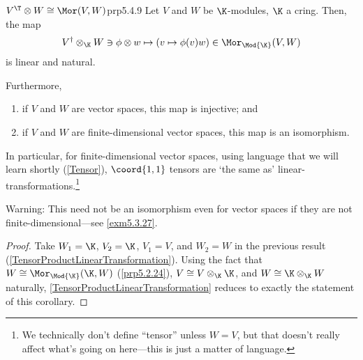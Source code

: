 \begin{crl}{$V^{\T}\otimes W\cong \Mor (V,W)$}{prp5.4.9}
	Let $V$ and $W$ be $\K$-modules, $\K$ a cring.  Then, the map
	\begin{equation}
		V^{\dagger}\otimes _{\K}W\ni \phi \otimes w\mapsto (v\mapsto \phi (v)w)\in \Mor _{\Mod{\K}}(V,W)
	\end{equation}
	is linear and natural.
	
	Furthermore,
	\begin{enumerate}
		\item if $V$ and $W$ are vector spaces, this map is injective; and
		\item if $V$ and $W$ are finite-dimensional vector spaces, this map is an isomorphism.
	\end{enumerate}
	\begin{rmk}
		In particular, for finite-dimensional vector spaces, using language that we will learn shortly (\cref{Tensor}), $\coord{1,1}$ tensors are `the same as' linear-transformations.\footnote{We technically don't define ``tensor'' unless $W=V$, but that doesn't really affect what's going on here---this is just a matter of language.}
	\end{rmk}
	\begin{rmk}
		Warning:  This need not be an isomorphism even for vector spaces if they are not finite-dimensional---see \cref{exm5.3.27}.
	\end{rmk}
	\begin{proof}
		Take $W_1=\K$, $V_2=\K$, $V_1=V$, and $W_2=W$ in the previous result (\cref{TensorProductLinearTransformation}).  Using the fact that $W\cong \Mor _{\Mod{\K}}(\K ,W)$ (\cref{prp5.2.24}), $V\cong V\otimes _{\K}\K$, and $W\cong \K \otimes _{\K}W$ naturally, \cref{TensorProductLinearTransformation} reduces to exactly the statement of this corollary.
	\end{proof}
\end{crl}
